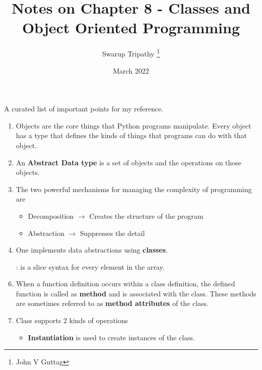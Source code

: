 \documentclass[11pt]{article}
\title{Notes on Chapter 8 - Classes and Object Oriented Programming}
\author{Swarup Tripathy \thanks{John V Guttag}}
\date{March 2022}
\begin{document}
    \maketitle
    A curated list of important points for my reference.\\
    \begin{enumerate}
        \item Objects are the core things that Python programs manipulate. Every object has a type that defines the kinds of things that programs can do with that object.
        \item An \textbf{Abstract Data type} is a set of objects and the operations on those objects.
        \item The two powerful mechanisms for managing the complexity of programming are 
        \begin{itemize}
            \item Decomposition $\rightarrow$ Creates the structure of the program
            \item Abstraction $\rightarrow$ Suppresses the detail
        \end{itemize}   
        \item One implements data abstractions using \textbf{classes}.     
        \item [:] is a slice syntax for every element in the array.
        \item When a function definition occurs within a class definition, the defined function is called as \textbf{method} and is associated with the class. These methods are sometimes referred to as \textbf{method attributes} of the class.
        \item Class supports 2 kinds of operations
        \begin{itemize}
            \item \textbf{Instantiation} is used to create instances of the class. 
            

\end{itemize}
\end{enumerate}
\end{document}
